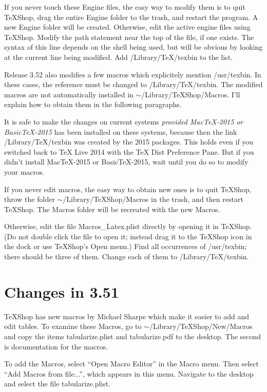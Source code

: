 \documentclass[11pt, oneside]{amsart}
\begin{document}
If you never touch these Engine files, the easy way to modify them is to quit TeXShop, drag the entire Engine folder to the trash, and restart the program. A new Engine folder will be created. Otherwise,  edit the active engine files using TeXShop. Modify the path statement near the top of the file, if one exists. The syntax of this line depends on the shell being used, but will be obvious by looking at the current line being modified. Add /Library/TeX/texbin to the list.

Release 3.52 also modifies a few macros which explicitely mention /usr/texbin. In these cases, the reference must be changed to /Library/TeX/texbin. The modified macros are not automatically
installed in $\sim$/Library/TeXShop/Macros.  I'll explain  how to obtain them in the
following paragraphs.

It is safe to make the changes on current systems {\em provided MacTeX-2015 or BasicTeX-2015}
has been installed on these systems, because then the link /Library/TeX/texbin was created by
the 2015 packages. This holds even if you  switched back to TeX Live 2014 with the
TeX Dist Preference Pane. But if you didn't install MacTeX-2015 or BasicTeX-2015, wait until you do so to modify your macros.

If you never edit macros, the easy way to obtain new ones is to quit TeXShop, throw the folder
$\sim$/Library/TeXShop/Macros in the trash, and then restart TeXShop. The Macros folder will be recreated with the new Macros.

Otherwise, edit the file Macros\_Latex.plist directly by opening it in TeXShop. (Do not double
click the file to open it; instead drag it to the TeXShop icon in the dock or use TeXShop's Open menu.)  Find all occurrences of /usr/texbin; there should be three of them.
Change each of them to /Library/TeX/texbin.





\section{Changes in 3.51}

TeXShop has new macros by Michael Sharpe which make it easier to add and edit tables. To
examine these Macros, go to $\sim$/Library/TeXShop/New/Macros and copy the items tabularize.plist and tabularize.pdf to the desktop. The second is documentation for the macros.

To add the Macros, select ``Open Macro Editor'' in the Macro menu. Then select ``Add Macros
from file...'', which appears in this menu. Navigate to the desktop and select the file
tabularize.plist.
\end{document}
